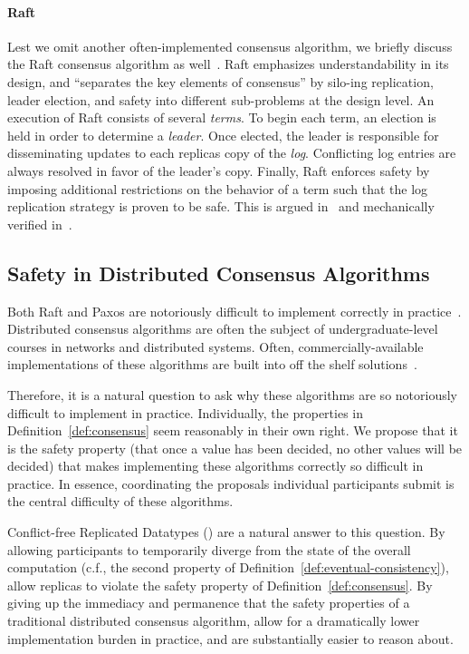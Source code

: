 \paragraph{Raft}
Lest we omit another often-implemented consensus algorithm, we briefly discuss
the Raft consensus algorithm as well~\citep{ongaro14}. Raft emphasizes
understandability in its design, and ``separates the key elements of consensus''
by silo-ing replication, leader election, and safety into different sub-problems
at the design level. An execution of Raft consists of several \textit{terms}. To
begin each term, an election is held in order to determine a \textit{leader}.
Once elected, the leader is responsible for disseminating updates to each
replicas copy of the \textit{log}. Conflicting log entries are always resolved
in favor of the leader's copy. Finally, Raft enforces safety by imposing
additional restrictions on the behavior of a term such that the log replication
strategy is proven to be safe. This is argued in~\citep{ongaro14} and
mechanically verified in~\citep{wilcox15}.

\subsection{Safety in Distributed Consensus Algorithms}
\label{sec:dca-safety}

\sloppy
Both Raft and Paxos are notoriously difficult to implement correctly in
practice~\citep{howard20}. Distributed consensus algorithms are often the
subject of undergraduate-level courses in networks and distributed systems.
Often, commercially-available implementations of these algorithms are built into
off the shelf solutions~\citep{etcd,zookeeper}.

Therefore, it is a natural question to ask why these algorithms are so
notoriously difficult to implement in practice. Individually, the properties in
Definition~\ref{def:consensus} seem reasonably in their own right. We propose
that it is the safety property (that once a value has been decided, no other
values will be decided) that makes implementing these algorithms correctly so
difficult in practice. In essence, coordinating the proposals individual
participants submit is the central difficulty of these algorithms.

Conflict-free Replicated Datatypes (\CRDTs) are a natural answer to this
question. By allowing participants to temporarily diverge from the state of the
overall computation (c.f., the second property of
Definition~\ref{def:eventual-consistency}), \CRDTs allow replicas to violate the
safety property of Definition~\ref{def:consensus}. By giving up the immediacy
and permanence that the safety properties of a traditional distributed consensus
algorithm, \CRDTs allow for a dramatically lower implementation burden in
practice, and are substantially easier to reason about.

